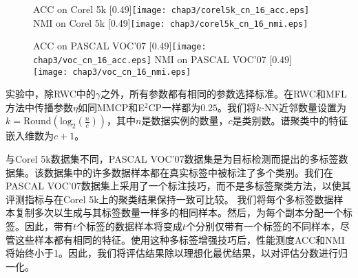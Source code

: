 \begin{figure}[t]
	\centering
					{ACC on  Corel 5k}
					[0.49\textwidth]{\texttt{[image: chap3/corel5k\_cn\_16\_acc.eps]}}
                    \label{fig3:corel5k_cn_16_acc}
					{NMI on  Corel 5k}
                    [0.49\textwidth]{\texttt{[image: chap3/corel5k\_cn\_16\_nmi.eps]}}
                    \label{fig3:corel5k_cn_16_nmi}
                    
	\centering
					{ACC on  PASCAL VOC'07}
					[0.49\textwidth]{\texttt{[image: chap3/voc\_cn\_16\_acc.eps]}}
                    \label{fig3:voc_cn_16_acc}
					{NMI on  PASCAL VOC'07}
					[0.49\textwidth]{\texttt{[image: chap3/voc\_cn\_16\_nmi.eps]}}
                    \label{fig3:voc_cn_16_nmi}
	\label{fig3:cn_16}
\end{figure} 

实验中，除RWC中的$\gamma $之外，所有参数都有相同的参数选择标准。在RWC和MFL方法中传播参数$ \eta $如同MMCP和E$^2$CP一样都为$ 0.25 $。我们将$k$-NN近邻数量设置为$ k = \mathrm{Round}(\mathrm{log}_2(\frac{n}{c}))$，其中$ n $是数据实例的数量，$ c $是类别数。谱聚类中的特征嵌入维数为$ c + 1 $。

与Corel 5k数据集不同，PASCAL VOC'07数据集是为目标检测而提出的多标签数据集。该数据集中的许多数据样本都在真实标签中被标注了多个类别。我们在PASCAL VOC'07数据集上采用了一个标注技巧，而不是多标签聚类方法，以使其评测指标与在Corel 5k上的聚类结果保持一致可比较。
我们将每个多标签数据样本复制多次以生成与其标签数量一样多的相同样本。然后，为每个副本分配一个标签。因此，带有$ t $个标签的数据样本将变成$ t $个分别仅带有一个标签的不同样本，尽管这些样本都有相同的特征。使用这种多标签增强技巧后，性能测度ACC和NMI将始终小于1。因此，我们将评估结果除以理想化最优结果，以对评估分数进行归一化。

